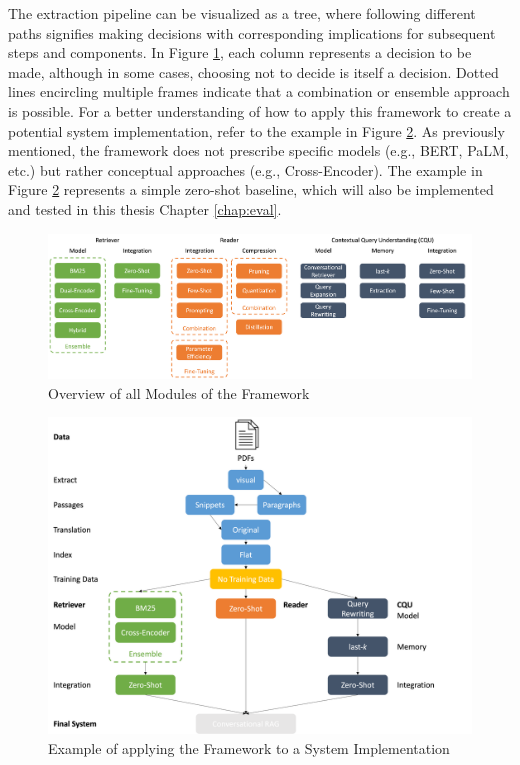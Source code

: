 The extraction pipeline can be visualized as a tree, where following different paths signifies making decisions with corresponding implications for subsequent steps and components. In Figure \ref{fig:all_components_conrag}, each column represents a decision to be made, although in some cases, choosing not to decide is itself a decision. Dotted lines encircling multiple frames indicate that a combination or ensemble approach is possible. For a better understanding of how to apply this framework to create a potential system implementation, refer to the example in Figure \ref{fig:example_decission_tree}. As previously mentioned, the framework does not prescribe specific models (e.g., BERT, PaLM, etc.) but rather conceptual approaches (e.g., Cross-Encoder). The example in Figure \ref{fig:example_decission_tree} represents a simple zero-shot baseline, which will also be implemented and tested in this thesis Chapter \ref{chap:eval}.

\begin{figure}
    \centering
    \includegraphics[width=\textwidth]{Grafiken/all_components_conrag.png}
    \caption{Overview of all Modules of the Framework}
    \label{fig:all_components_conrag}
\end{figure}

\begin{figure}
    \centering
    \includegraphics[width=\textwidth]{Grafiken/example_decission_tree.png}
    \caption{Example of applying the Framework to a System Implementation}
    \label{fig:example_decission_tree}
\end{figure}



